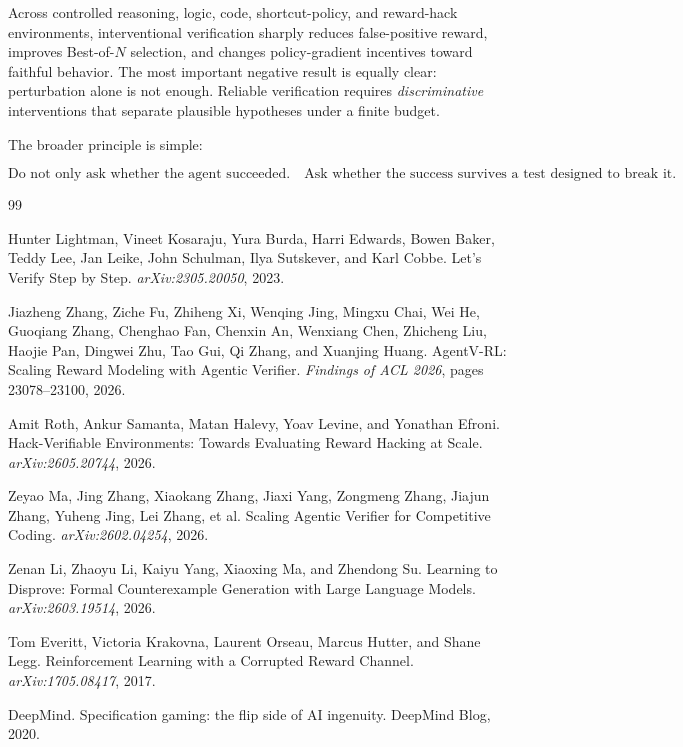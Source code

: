 \documentclass[10pt]{article}
\begin{document}
Across controlled reasoning, logic, code, shortcut-policy, and reward-hack environments, interventional verification sharply reduces false-positive reward, improves Best-of-$N$ selection, and changes policy-gradient incentives toward faithful behavior. The most important negative result is equally clear: perturbation alone is not enough. Reliable verification requires \emph{discriminative} interventions that separate plausible hypotheses under a finite budget.

The broader principle is simple:

\[
\boxed{
\text{Do not only ask whether the agent succeeded.}
\quad
\text{Ask whether the success survives a test designed to break it.}
}
\]


\begin{thebibliography}{99}

Hunter Lightman, Vineet Kosaraju, Yura Burda, Harri Edwards, Bowen Baker, Teddy Lee, Jan Leike, John Schulman, Ilya Sutskever, and Karl Cobbe.
\newblock Let's Verify Step by Step.
\newblock \emph{arXiv:2305.20050}, 2023.

Jiazheng Zhang, Ziche Fu, Zhiheng Xi, Wenqing Jing, Mingxu Chai, Wei He, Guoqiang Zhang, Chenghao Fan, Chenxin An, Wenxiang Chen, Zhicheng Liu, Haojie Pan, Dingwei Zhu, Tao Gui, Qi Zhang, and Xuanjing Huang.
\newblock AgentV-RL: Scaling Reward Modeling with Agentic Verifier.
\newblock \emph{Findings of ACL 2026}, pages 23078--23100, 2026.

Amit Roth, Ankur Samanta, Matan Halevy, Yoav Levine, and Yonathan Efroni.
\newblock Hack-Verifiable Environments: Towards Evaluating Reward Hacking at Scale.
\newblock \emph{arXiv:2605.20744}, 2026.

Zeyao Ma, Jing Zhang, Xiaokang Zhang, Jiaxi Yang, Zongmeng Zhang, Jiajun Zhang, Yuheng Jing, Lei Zhang, et al.
\newblock Scaling Agentic Verifier for Competitive Coding.
\newblock \emph{arXiv:2602.04254}, 2026.

Zenan Li, Zhaoyu Li, Kaiyu Yang, Xiaoxing Ma, and Zhendong Su.
\newblock Learning to Disprove: Formal Counterexample Generation with Large Language Models.
\newblock \emph{arXiv:2603.19514}, 2026.

Tom Everitt, Victoria Krakovna, Laurent Orseau, Marcus Hutter, and Shane Legg.
\newblock Reinforcement Learning with a Corrupted Reward Channel.
\newblock \emph{arXiv:1705.08417}, 2017.

DeepMind.
\newblock Specification gaming: the flip side of AI ingenuity.
\newblock DeepMind Blog, 2020.

\end{thebibliography}
\end{document}
